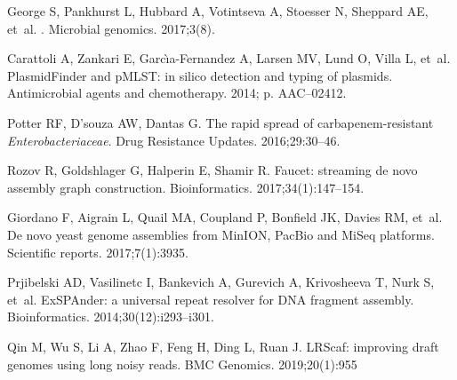 \documentclass[10pt,letterpaper]{article}
\begin{document}
\begin{thebibliography}{10}
George S, Pankhurst L, Hubbard A, Votintseva A, Stoesser N, Sheppard AE, et~al.
.
\newblock Microbial genomics. 2017;3(8).

Carattoli A, Zankari E, Garc{\`\i}a-Fernandez A, Larsen MV, Lund O, Villa L,
  et~al.
\newblock PlasmidFinder and pMLST: in silico detection and typing of plasmids.
\newblock Antimicrobial agents and chemotherapy. 2014; p. AAC--02412.

Potter RF, D’souza AW, Dantas G.
\newblock The rapid spread of carbapenem-resistant \emph{Enterobacteriaceae}.
\newblock Drug Resistance Updates. 2016;29:30--46.

Rozov R, Goldshlager G, Halperin E, Shamir R.
\newblock Faucet: streaming de novo assembly graph construction.
\newblock Bioinformatics. 2017;34(1):147--154.

Giordano F, Aigrain L, Quail MA, Coupland P, Bonfield JK, Davies RM, et~al.
\newblock De novo yeast genome assemblies from MinION, PacBio and MiSeq platforms.
\newblock Scientific reports. 2017;7(1):3935.

Prjibelski AD, Vasilinetc I, Bankevich A, Gurevich A, Krivosheeva T, Nurk S,
  et~al.
\newblock ExSPAnder: a universal repeat resolver for DNA fragment assembly.
\newblock Bioinformatics. 2014;30(12):i293--i301.

Qin M, Wu S, Li A, Zhao F, Feng H, Ding L, Ruan J.
\newblock LRScaf: improving draft genomes using long noisy reads.
\newblock BMC Genomics. 2019;20(1):955


\end{thebibliography}
\end{document}
